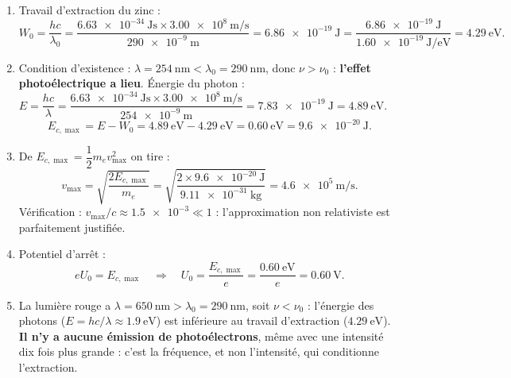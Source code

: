 \documentclass[11pt]{article}
\begin{document}
\begin{corrige}
\begin{enumerate}
\item Travail d'extraction du zinc :
\[ W_0 = \frac{hc}{\lambda_0} = \frac{\SI{6,63e-34}{\joule\second}\times\SI{3,00e8}{\meter\per\second}}{\SI{290e-9}{\meter}} = \SI{6,86e-19}{\joule} = \frac{\SI{6,86e-19}{\joule}}{\SI{1,60e-19}{\joule\per\electronvolt}} = \SI{4,29}{\electronvolt}. \]
\item Condition d'existence : $\lambda = \SI{254}{\nano\meter} < \lambda_0 = \SI{290}{\nano\meter}$, donc $\nu > \nu_0$ : \textbf{l'effet photoélectrique a lieu}.
Énergie du photon : $E = \dfrac{hc}{\lambda} = \dfrac{\SI{6,63e-34}{\joule\second}\times\SI{3,00e8}{\meter\per\second}}{\SI{254e-9}{\meter}} = \SI{7,83e-19}{\joule} = \SI{4,89}{\electronvolt}$.
\[ E_{c,\max} = E - W_0 = \SI{4,89}{\electronvolt} - \SI{4,29}{\electronvolt} = \SI{0,60}{\electronvolt} = \SI{9,6e-20}{\joule}. \]
\item De $E_{c,\max} = \dfrac{1}{2}m_e v_{\max}^2$ on tire :
\[ v_{\max} = \sqrt{\frac{2E_{c,\max}}{m_e}} = \sqrt{\frac{2\times\SI{9,6e-20}{\joule}}{\SI{9,11e-31}{\kilogram}}} = \SI{4,6e5}{\meter\per\second}. \]
Vérification : $v_{\max}/c \approx \num{1,5e-3} \ll 1$ : l'approximation non relativiste est parfaitement justifiée.
\item Potentiel d'arrêt :
\[ eU_0 = E_{c,\max} \quad\Rightarrow\quad U_0 = \frac{E_{c,\max}}{e} = \frac{\SI{0,60}{\electronvolt}}{e} = \SI{0,60}{\volt}. \]
\item La lumière rouge a $\lambda = \SI{650}{\nano\meter} > \lambda_0 = \SI{290}{\nano\meter}$, soit $\nu < \nu_0$ : l'énergie des photons ($E = hc/\lambda \approx \SI{1,9}{\electronvolt}$) est inférieure au travail d'extraction ($\SI{4,29}{\electronvolt}$). \textbf{Il n'y a aucune émission de photoélectrons}, même avec une intensité dix fois plus grande : c'est la fréquence, et non l'intensité, qui conditionne l'extraction.
\end{enumerate}
\end{corrige}
\end{document}

